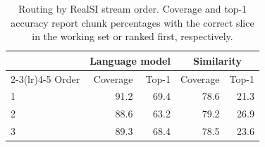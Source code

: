 \begin{table}[H]
\centering
\small
\begin{tabular}{lrrrr}
\toprule
& \multicolumn{2}{c}{Language model} & \multicolumn{2}{c}{Similarity} \\
\cmidrule(lr){2-3}\cmidrule(lr){4-5}
Order & Coverage & Top-1 & Coverage & Top-1 \\
\midrule
1 & 91.2 & 69.4 & 78.6 & 21.3 \\
2 & 88.6 & 63.2 & 79.2 & 26.9 \\
3 & 89.3 & 68.4 & 78.5 & 23.6 \\
\bottomrule
\end{tabular}
\caption{Routing by RealSI stream order. Coverage and top-1 accuracy report
chunk percentages with the correct slice in the working set or ranked first,
respectively.}
\label{tab:realsi-orders}
\end{table}
